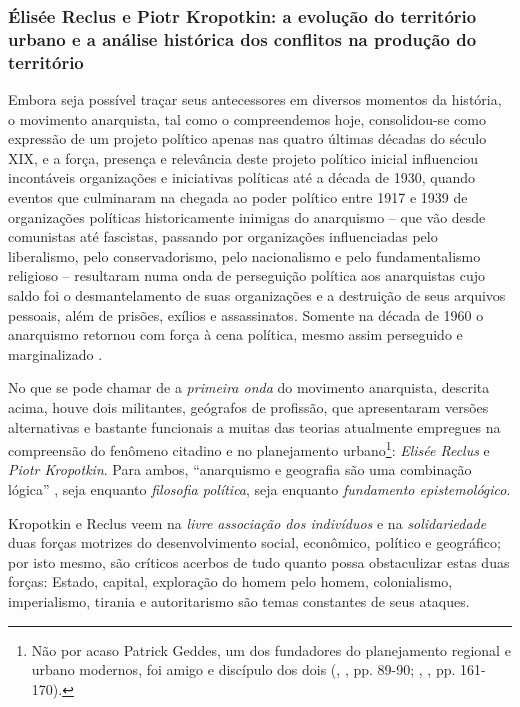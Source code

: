 \subsubsection{Élisée Reclus e Piotr Kropotkin: a evolução do território urbano e a análise histórica dos conflitos na produção do território}

Embora seja possível traçar seus antecessores em diversos momentos da história, o movimento anarquista, tal como o compreendemos hoje, consolidou-se como expressão de um projeto político apenas nas quatro últimas décadas do século XIX, e a força, presença e relevância deste projeto político inicial influenciou incontáveis organizações e iniciativas políticas até a década de 1930, quando eventos que culminaram na chegada ao poder político entre 1917 e 1939 de organizações políticas historicamente inimigas do anarquismo -- que vão desde comunistas até fascistas, passando por organizações influenciadas pelo liberalismo, pelo conservadorismo, pelo nacionalismo e pelo fundamentalismo religioso -- resultaram numa onda de perseguição política aos anarquistas cujo saldo foi o desmantelamento de suas organizações e a destruição de seus arquivos pessoais, além de prisões, exílios e assassinatos. Somente na década de 1960 o anarquismo retornou com força à cena política, mesmo assim perseguido e marginalizado \cite{WOODCOCK2008}. 

No que se pode chamar de a \textit{primeira onda} do movimento anarquista, descrita acima, houve dois militantes, geógrafos de profissão, que apresentaram versões alternativas e bastante funcionais a muitas das teorias atualmente empregues na compreensão do fenômeno citadino e no planejamento urbano\footnote{Não por acaso Patrick Geddes, um dos fundadores do planejamento regional e urbano modernos, foi amigo e discípulo dos dois (\citeauthor{dunbar_elisee_1989}, \citeyear{dunbar_elisee_1989}, pp. 89-90; \citeauthor{hall_cidades_2007}, \citeyear{hall_cidades_2007}, pp. 161-170).}: \textit{Elisée Reclus }e \textit{Piotr Kropotkin}. Para ambos, ``anarquismo e geografia são uma combinação lógica'' \cite[p.~78]{dunbar_elisee_1989}, seja enquanto \textit{filosofia política}, seja enquanto \textit{fundamento epistemológico}.

Kropotkin e Reclus veem na \textit{livre associação dos indivíduos} e na \textit{solidariedade} duas forças motrizes do desenvolvimento social, econômico, político e geográfico; por isto mesmo, são críticos acerbos de tudo quanto possa obstaculizar estas duas forças: Estado, capital, exploração do homem pelo homem, colonialismo, imperialismo, tirania e autoritarismo são temas constantes de seus ataques.

